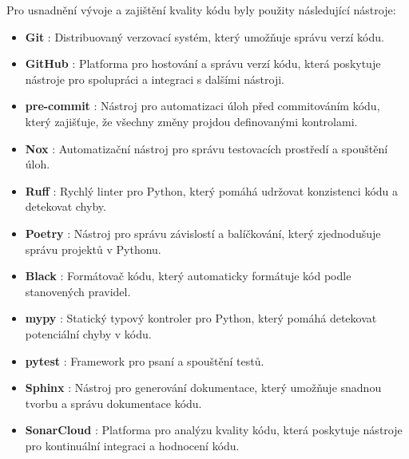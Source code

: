 Pro usnadnění vývoje a zajištění kvality kódu byly použity následující nástroje:
\begin{itemize}
    \item \textbf{Git} \cite{git}: Distribuovaný verzovací systém, který umožňuje správu verzí kódu.
    \item \textbf{GitHub} \cite{github}:  Platforma pro hostování a správu verzí kódu, která poskytuje nástroje pro spolupráci a integraci s dalšími nástroji.
    \item \textbf{pre-commit} \cite{precommit}: Nástroj pro automatizaci úloh před commitováním kódu, který zajišťuje, že všechny změny projdou definovanými kontrolami.
    \item \textbf{Nox} \cite{nox}: Automatizační nástroj pro správu testovacích prostředí a spouštění úloh.
    \item \textbf{Ruff} \cite{ruff}: Rychlý linter pro Python, který pomáhá udržovat konzistenci kódu a detekovat chyby.
    \item \textbf{Poetry} \cite{poetry}: Nástroj pro správu závislostí a balíčkování, který zjednodušuje správu projektů v Pythonu.
    \item \textbf{Black} \cite{black}: Formátovač kódu, který automaticky formátuje kód podle stanovených pravidel.
    \item \textbf{mypy} \cite{mypy}:  Statický typový kontroler pro Python, který pomáhá detekovat potenciální chyby v kódu.
    \item \textbf{pytest} \cite{pytest}: Framework pro psaní a spouštění testů.
    \item \textbf{Sphinx} \cite{sphinx}: Nástroj pro generování dokumentace, který umožňuje snadnou tvorbu a správu dokumentace kódu.
    \item \textbf{SonarCloud} \cite{sonarcloud}: Platforma pro analýzu kvality kódu, která poskytuje nástroje pro kontinuální integraci a hodnocení kódu.
\end{itemize}
